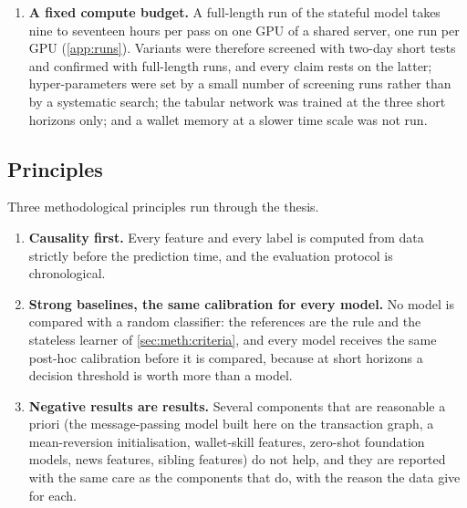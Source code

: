 \begin{enumerate}[nosep]
  sequential state against one without, on the same inputs; the same stateful model with
  and without the transaction edges; the same host learner with and without each
  external source.  Approaches that would not add such a comparison are outside the
  scope: outcome forecasting with language models, the subject of most prior work on
  Polymarket (\cref{sec:pm:related}), trading strategies and their profitability, and
  per-market models.
  \item \textbf{A fixed compute budget.}  A full-length run of the stateful model takes
  nine to seventeen hours per pass on one GPU of a shared server, one run per GPU
  (\cref{app:runs}).  Variants were therefore screened with two-day short tests and
  confirmed with full-length runs, and every claim rests on the latter; hyper-parameters
  were set by a small number of screening runs rather than by a systematic search; the
  tabular network was trained at the three short horizons only; and a wallet memory at a
  slower time scale was not run.
\end{enumerate}

\subsection{Principles}
\label{sec:intro:principles}

Three methodological principles run through the thesis.

\begin{enumerate}[nosep]
  \item \textbf{Causality first.}  Every feature and every label is computed from data
  strictly before the prediction time, and the evaluation protocol is chronological.
  \item \textbf{Strong baselines, the same calibration for every model.}  No model is
  compared with a random classifier: the references are the rule and the stateless
  learner of \cref{sec:meth:criteria}, and every model receives the same post-hoc
  calibration before it is compared, because at short horizons a decision threshold is
  worth more than a model.
  \item \textbf{Negative results are results.}  Several components that are reasonable
  a priori (the message-passing model built here on the transaction graph, a
  mean-reversion initialisation, wallet-skill
  features, zero-shot foundation models, news features, sibling features) do not help,
  and they are reported with the same care as the components that do, with the
  reason the data give for each.
\end{enumerate}

